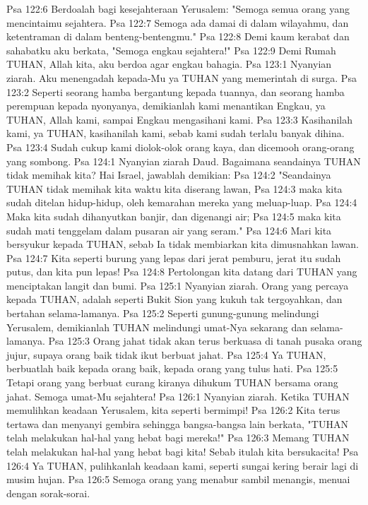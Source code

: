 Psa 122:6  Berdoalah bagi kesejahteraan Yerusalem: "Semoga semua orang yang mencintaimu sejahtera.
Psa 122:7  Semoga ada damai di dalam wilayahmu, dan ketentraman di dalam benteng-bentengmu."
Psa 122:8  Demi kaum kerabat dan sahabatku aku berkata, "Semoga engkau sejahtera!"
Psa 122:9  Demi Rumah TUHAN, Allah kita, aku berdoa agar engkau bahagia.
Psa 123:1  Nyanyian ziarah. Aku menengadah kepada-Mu ya TUHAN yang memerintah di surga.
Psa 123:2  Seperti seorang hamba bergantung kepada tuannya, dan seorang hamba perempuan kepada nyonyanya, demikianlah kami menantikan Engkau, ya TUHAN, Allah kami, sampai Engkau mengasihani kami.
Psa 123:3  Kasihanilah kami, ya TUHAN, kasihanilah kami, sebab kami sudah terlalu banyak dihina.
Psa 123:4  Sudah cukup kami diolok-olok orang kaya, dan dicemooh orang-orang yang sombong.
Psa 124:1  Nyanyian ziarah Daud. Bagaimana seandainya TUHAN tidak memihak kita? Hai Israel, jawablah demikian:
Psa 124:2  "Seandainya TUHAN tidak memihak kita waktu kita diserang lawan,
Psa 124:3  maka kita sudah ditelan hidup-hidup, oleh kemarahan mereka yang meluap-luap.
Psa 124:4  Maka kita sudah dihanyutkan banjir, dan digenangi air;
Psa 124:5  maka kita sudah mati tenggelam dalam pusaran air yang seram."
Psa 124:6  Mari kita bersyukur kepada TUHAN, sebab Ia tidak membiarkan kita dimusnahkan lawan.
Psa 124:7  Kita seperti burung yang lepas dari jerat pemburu, jerat itu sudah putus, dan kita pun lepas!
Psa 124:8  Pertolongan kita datang dari TUHAN yang menciptakan langit dan bumi.
Psa 125:1  Nyanyian ziarah. Orang yang percaya kepada TUHAN, adalah seperti Bukit Sion yang kukuh tak tergoyahkan, dan bertahan selama-lamanya.
Psa 125:2  Seperti gunung-gunung melindungi Yerusalem, demikianlah TUHAN melindungi umat-Nya sekarang dan selama-lamanya.
Psa 125:3  Orang jahat tidak akan terus berkuasa di tanah pusaka orang jujur, supaya orang baik tidak ikut berbuat jahat.
Psa 125:4  Ya TUHAN, berbuatlah baik kepada orang baik, kepada orang yang tulus hati.
Psa 125:5  Tetapi orang yang berbuat curang kiranya dihukum TUHAN bersama orang jahat. Semoga umat-Mu sejahtera!
Psa 126:1  Nyanyian ziarah. Ketika TUHAN memulihkan keadaan Yerusalem, kita seperti bermimpi!
Psa 126:2  Kita terus tertawa dan menyanyi gembira sehingga bangsa-bangsa lain berkata, "TUHAN telah melakukan hal-hal yang hebat bagi mereka!"
Psa 126:3  Memang TUHAN telah melakukan hal-hal yang hebat bagi kita! Sebab itulah kita bersukacita!
Psa 126:4  Ya TUHAN, pulihkanlah keadaan kami, seperti sungai kering berair lagi di musim hujan.
Psa 126:5  Semoga orang yang menabur sambil menangis, menuai dengan sorak-sorai.
